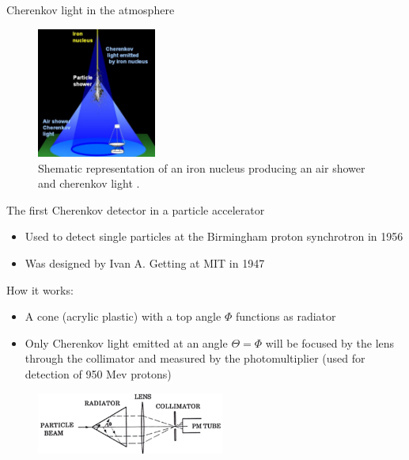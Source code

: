 \documentclass[aspectratio=1610, 10pt]{beamer}
\begin{document}

\begin{frame}{Cherenkov light in the atmosphere}
  \begin{figure}
    \includegraphics[width=0.35\textwidth]{images/cherenkov_cone.png}
    \caption{Shematic representation of an iron nucleus producing an air shower and cherenkov light \cite{hess}.}
  \end{figure}
\end{frame}

\begin{frame}{The first Cherenkov detector in a particle accelerator}
  \begin{itemize}
    \item Used to detect single particles at the Birmingham proton synchrotron in 1956
    \medskip
    \item Was designed by Ivan A. Getting at MIT in 1947
  \end{itemize}

How it works:
\begin{itemize}
  \item A cone (acrylic plastic) with a top angle $\Phi$ functions as radiator
  \medskip
  \item Only Cherenkov light emitted at an angle $\Theta = \Phi$ will be focused by the lens through the collimator and measured by the
  photomultiplier (used for detection of 950 Mev protons)
\end{itemize}
\begin{figure}
  \includegraphics[width=0.55\textwidth]{images/the_second.png}
\end{figure}
\end{frame}
\end{document}
